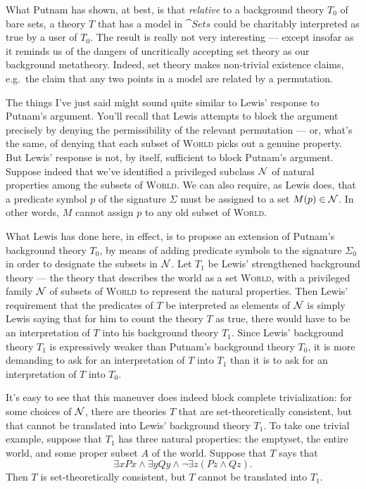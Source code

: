 What Putnam has shown, at best, is that {\it relative} to a background
theory $T_0$ of bare sets, a theory $T$ that has a model in
$\cat{Sets}$ could be charitably interpreted as true by a user of
$T_0$.  The result is really not very interesting --- except insofar
as it reminds us of the dangers of uncritically accepting set theory
as our background metatheory.  Indeed, set theory makes non-trivial
existence claims, e.g.\ the claim that any two points in a model are
related by a permutation.

The things I've just said might sound quite similar to Lewis'
\citeyearpar{lewis-putnam} response to Putnam's argument.  You'll
recall that Lewis attempts to block the argument precisely by denying
the permissibility of the relevant permutation --- or, what's the
same, of denying that each subset of \textsc{World} picks out a
genuine property.  But Lewis' response is not, by itself, sufficient
to block Putnam's argument.  Suppose indeed that we've identified a
privileged subclass $\cal{N}$ of natural properties among the subsets
of \textsc{World}.  We can also require, as Lewis does, that a
predicate symbol $p$ of the signature $\Sigma$ must be assigned to a
set $M(p)\in \cal{N}$.  In other words, $M$ cannot assign $p$ to any
old subset of \textsc{World}.

What Lewis has done here, in effect, is to propose an extension of
Putnam's background theory $T_0$, by means of adding predicate symbols
to the signature $\Sigma _0$ in order to designate the subsets in
$\cal{N}$.  Let $T_1$ be Lewis' strengthened background theory --- the
theory that describes the world as a set \textsc{World}, with a
privileged family $\cal N$ of subsets of \textsc{World} to represent the
natural properties.  Then Lewis' requirement that the predicates of
$T$ be interpreted as elements of $\cal N$ is simply Lewis saying that
for him to count the theory $T$ as true, there would have to be an
interpretation of $T$ into his background theory $T_1$.  Since Lewis'
background theory $T_1$ is expressively weaker than Putnam's
background theory $T_0$, it is more demanding to ask for an
interpretation of $T$ into $T_1$ than it is to ask for an
interpretation of $T$ into $T_0$.

It's easy to see that this maneuver does indeed block complete
trivialization: for some choices of $\cal N$, there are theories $T$ that
are set-theoretically consistent, but that cannot be translated into
Lewis' background theory $T_1$.  To take one trivial example, suppose
that $T_1$ has three natural properties: the emptyset, the entire
world, and some proper subset $A$ of the world.  Suppose that $T$ says
that
\[ \exists xPx\wedge \exists yQy\wedge \neg\exists z(Pz\wedge Qz) .\]
Then $T$ is set-theoretically consistent, but $T$ cannot be translated
into $T_1$.


